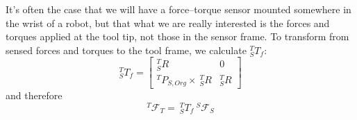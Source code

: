 \documentclass[]{article}
\begin{document}
It's often the case that we will have a force--torque sensor mounted somewhere in the wrist of a robot, but that what we are really interested is the forces and torques applied at the tool tip, not those in the sensor frame. To transform from sensed forces and torques to the tool frame, we calculate $^{T}_{S}T_{f}$:
\begin{displaymath}
	^{T}_{S}T_{f} = \left[ \begin{array}{cc} ^{T}_{S}R & 0 \\ ^{T}P_{S,Org}\times \ \!^{T}_{S}R & ^{T}_{S}R \end{array}\right]
\end{displaymath}
and therefore
\begin{displaymath}
^{T}\mathcal{F}_{T} = \ \!^{T}_{S}T_{f}\ \!^{S}\mathcal{F}_{S}
\end{displaymath}
\end{document}
